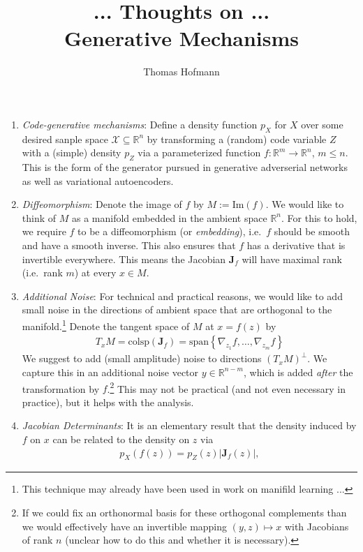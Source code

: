 \documentclass{article}
\title{{\large ... Thoughts on ...} \\ Generative Mechanisms}
\author{Thomas Hofmann}
\newcommand{\J}{{\mathbf J}}
\renewcommand{\Re}{{\mathbb R}}
\begin{document}
\maketitle

\begin{enumerate}
\item \textit{Code-generative mechanisms}: Define a density function $p_X$ for $X$ over some desired sanple space $\mathcal X \subseteq \Re^n$ by transforming a (random)  code variable $Z$ with a (simple) density $p_Z$  via a parameterized function $f: \Re^m \to \Re^n$, $m \le n$. This is the form of the generator pursued in generative adverserial networks as well as variational autoencoders.
\item \textit{Diffeomorphism}: Denote the image of $f$ by $M := \text{Im}(f)$. We would like to think of $M$ as a manifold embedded in the ambient space $\Re^n$. For this to hold, we require $f$ to be a diffeomorphism (or \textit{embedding}), i.e.~$f$ should be smooth and have a smooth inverse. This also ensures that $f$ has a derivative that is invertible everywhere. This means the Jacobian $\J_f$  will have maximal rank (i.e.~rank $m$) at every $x \in M$. 
\item \textit{Additional Noise}: For technical and practical reasons, we would like to add small noise in the directions of ambient space that are orthogonal to the manifold.\footnote{This technique may already have been used in work on manifild learning ...} Denote the tangent space of $M$ at $x = f(z)$ by
\begin{align}
T_x M = \text{colsp}(\J_f) = \text{span}\left\{ \nabla_{z_1} f, \dots, \nabla_{z_m} f\right\}
\end{align}
We suggest to add (small amplitude) noise to directions $(T_x M)^\perp$.  We capture this in an additional noise vector $y \in \Re^{n-m}$, which is added \textit{after} the transformation by $f$.\footnote{If we could fix an orthonormal basis for these orthogonal complements than we would effectively have an invertible mapping $(y,z) \mapsto x$ with Jacobians of rank $n$ (unclear how to do this and whether it is necessary).} This may not be practical (and not even necessary in practice), but it helps with the analysis. 
\item \textit{Jacobian Determinants}: It is an elementary result that the density induced by $f$ on $x$ can be related to the density on $z$ via
\begin{align}
p_X(f(z)) = p_Z(z) \left| \J_f (z)\right|,
\end{align}

\end{enumerate}
\end{document}
